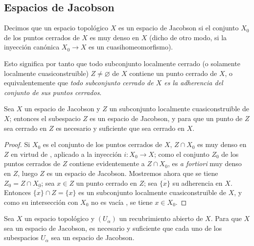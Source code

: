 \subsection{Espacios de Jacobson}
\label{subsection:IV.10.3}


\begin{definition}[10.3.1]
\label{IV.10.3.1}
Decimos que un espacio topológico $X$ es un espacio de Jacobson si el conjunto $X_0$ de los puntos cerrados de $X$ es muy denso en $X$ \textup{(dicho de otro modo, si la inyección canónica $X_0\to X$ es un }cuasihomeomorfismo\textup{)}.
\end{definition}

Esto significa por tanto  que todo subconjunto localmente cerrado (o solamente localmente cuasiconstruible) $Z\neq\varnothing$ de $X$ contiene un punto cerrado de $X$, o equivalentemente que \emph{todo subconjunto cerrado de $X$ es la adherencia del conjunto de sus puntos cerrados}.

\begin{proposition}[10.3.2]
\label{IV.10.3.2}
Sea $X$ un espacio de Jacobson y $Z$ un subconjunto localmente cuasiconstruible de $X$; entonces el subespacio $Z$ es un espacio de Jacobson, y para que un punto de $Z$ sea cerrado en $Z$ es necesario y suficiente que sea cerrado en $X$.
\end{proposition}

\begin{proof}
Si $X_0$ es el conjunto de los puntos cerrados de $X$, $Z\cap X_0$ es muy denso en $Z$ en virtud de , aplicado a la inyección $i:X_0\to X$; como el conjunto $Z_0$ de los puntos cerrados de $Z$ contiene evidentemente a $Z\cap X_0$, es \emph{a fortiori} muy denso en $Z$, luego $Z$ es un espacio de Jacobson.
Mostremos ahora que se tiene $Z_0=Z\cap X_0$; sea $x\in Z$ un punto cerrado en $Z$; sea $\overline{\{x\}}$ su adherencia en $X$. Entonces $\overline{\{x\}}\cap Z=\{x\}$ es un subconjunto localmente cuasiconstruible de $X$, y como su intersección con $X_0$ no es vacía , se tiene $x\in X_0$.
\end{proof}

\begin{proposition}[10.3.3]
\label{IV.10.3.3}
Sea $X$ un espacio topológico y $(U_\alpha)$ un recubrimiento abierto de $X$.
Para que $X$ sea un espacio de Jacobson, es necesario y suficiente que cada uno de los subespacios $U_\alpha$ sea un espacio de Jacobson.
\end{proposition}

